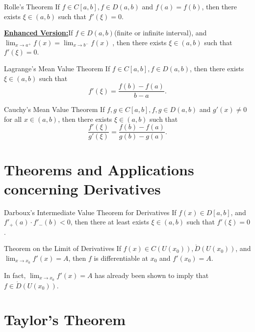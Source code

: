 \documentclass[11pt]{elegantbook}
\begin{document}
\begin{theorem}{Rolle's Theorem}
    If \(f\in C[a,b], f\in D(a,b)\) and \(f(a) = f(b)\), then there exists \(\xi\in (a,b)\) such that \(f'(\xi) = 0\).

    \underline{\textbf{Enhanced Version:}}If \(f\in D(a,b)\)(finite or infinite interval), 
    and \(\lim_{x \to a^{+}} f(x) = \lim_{x \to b^{-}} f(x) \) , 
    then there exists \(\xi\in (a,b)\) such that \(f'(\xi) = 0\).
\end{theorem}

\begin{theorem}{Lagrange's Mean Value Theorem}
    If \(f\in C[a,b], f\in D(a,b)\), then there exists \(\xi\in (a,b)\) such that
    \[
        f'(\xi) = \frac{f(b) - f(a)}{b - a}.
    \]
\end{theorem}

\begin{theorem}{Cauchy's Mean Value Theorem}
    If \(f,g\in C[a,b], f,g\in D(a,b)\) and \(g'(x) \neq 0\) for all \(x\in (a,b)\), 
    then there exists \(\xi\in (a,b)\) such that
    \[
        \frac{f'(\xi)}{g'(\xi)} = \frac{f(b) - f(a)}{g(b) - g(a)}.
    \]
\end{theorem}



\section{Theorems and Applications concerning Derivatives}

\begin{theorem}{Darboux's Intermediate Value Theorem for Derivatives}
    If \(f(x)\in D[a,b]\), and \(f'_{+}(a)\cdot f'_{-}(b)<0\),
    then there at least exists \(\xi\in (a,b)\) such that \(f'(\xi) = 0\).
\end{theorem}

\begin{theorem}{Theorem on the Limit of Derivatives}
    If \(f(x)\in C(U(x_{0})),\mathring{D}(U(x_{0}))\), and \(\lim_{x \to x_{0}} f'(x) = A\),
    then \(f\) is differentiable at \(x_{0}\) and \(f'(x_{0}) = A\).
\end{theorem}
\begin{remark}
    In fact, \(\lim_{x \to x_{0}} f'(x) = A\) has already been shown to imply that \(f\in \mathring{D}(U(x_{0}))\).
\end{remark}

\section{Taylor's Theorem}
\end{document}
